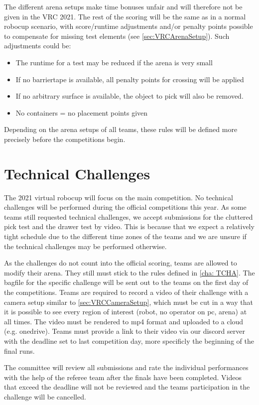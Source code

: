 The different arena setups make time bonuses unfair and will therefore not be given in the VRC 2021. 
The rest of the scoring will be the same as in a normal robocup scenario, with score/runtime adjustments and/or penalty points possible to compensate for missing test elements (see \ref{sec:VRCArenaSetup}). Such adjustments could be:

\begin{itemize}
\item The runtime for a test may be reduced if the arena is very small
\item If no barriertape is available, all penalty points for crossing will be applied
\item If no arbitrary surface is available, the object to pick will also be removed. 
\item No containers = no placement points given
\end{itemize}

Depending on the arena setups of all teams, these rules will be defined more precisely before the competitions begin.

\section{Technical Challenges} 
\label{sec:VRCTecCha}

The 2021 virtual robocup will focus on the main competition. No technical challenges will be performed during the official competitions this year. As some teams still requested technical challenges, we accept submissions for the cluttered pick test and the drawer test by video. This is because that we expect a relatively tight schedule due to the different time zones of the teams and we are unsure if the technical challenges may be performed otherwise.

As the challenges do not count into the official scoring, teams are allowed to modify their arena. They still must stick to the rules defined in \ref{cha: TCHA}. The bagfile for the specific challenge will be sent out to the teams on the first day of the competitions. Teams are required to record a video of their challenge with a camera setup similar to \ref{sec:VRCCameraSetup}, which must be cut in a way that it is possible to see every region of interest (robot, no operator on pc, arena) at all times. The video must be rendered to mp4 format and uploaded to a cloud (e.g. onedrive). 
Teams must provide a link to their video via our discord server with the deadline set to last competition day, more specificly the beginning of the final runs.

The committee will review all submissions and rate the individual performances with the help of the referee team after the finals have been completed. Videos that exceed the deadline will not be reviewed and the teams participation in the challenge will be cancelled.











